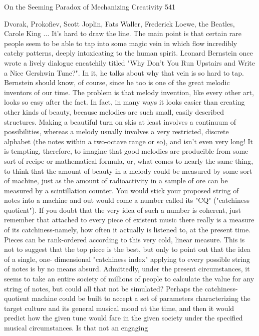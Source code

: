 On the Seeming Paradox of Mechanizing Creativity                                       541

Dvorak, Prokofiev, Scott Joplin, Fats Waller, Frederick Loewe, the Beatles, Carole
King ... It's hard to draw the line.
         The main point is that certain rare people seem to be able to tap into some
magic vein in which flow incredibly catchy patterns, deeply intoxicating to the human
spirit. Leonard Bernstein once wrote a lively dialogue encatchily titled "Why Don't
You Run Upstairs and Write a Nice Gershwin Tune?". In it, he talks about why that
vein is so hard to tap. Bernstein should know, of course, since he too is one of the
great melodic inventors of our time.
         The problem is that melody invention, like every other art, looks so easy after
the fact. In fact, in many ways it looks easier than creating other kinds of beauty,
because melodies are such small, easily described structures. Making a beautiful turn
on skis at least involves a continuum of possibilities, whereas a melody usually
involves a very restricted, discrete alphabet (the notes within a two-octave range or
so), and isn't even very long!
         It is tempting, therefore, to imagine that good melodies are producible from
some sort of recipe or mathematical formula, or, what comes to nearly the same thing,
to think that the amount of beauty in a melody could be measured by some sort of
machine, just as the amount of radioactivity in a sample of ore can be measured by a
scintillation counter. You would stick your proposed string of notes into a machine
and out would come a number called its "CQ" ("catchiness quotient").
         If you doubt that the very idea of such a number is coherent, just remember
that attached to every piece of existent music there really is a measure of its
catchiness-namely, how often it actually is listened to, at the present time. Pieces can
be rank-ordered according to this very cold, linear measure. This is not to suggest that
the top piece is the best, but only to point out that the idea of a single, one-
dimensional "catchiness index" applying to every possible string of notes is by no
means absurd. Admittedly, under the present circumstances, it seems to take an entire
society of millions of people to calculate the value for any string of notes, but could
all that not be simulated? Perhaps the catchiness-quotient machine could be built to
accept a set of parameters characterizing the target culture and its general musical
mood at the time, and then it would predict how the given tune would fare in the
given society under the specified musical circumstances. Is that not an engaging
